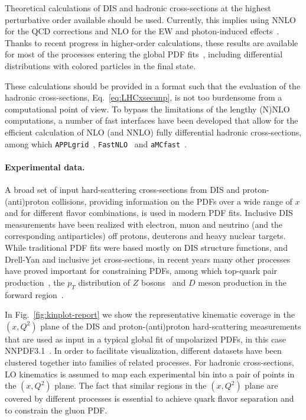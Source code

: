 Theoretical calculations of DIS and hadronic cross-sections at the highest 
perturbative order available should be used.
%
Currently, this implies using NNLO for the QCD corrections and NLO
for the EW and photon-induced effects~\cite{Manohar:2016nzj,Manohar:2017eqh}.
%
Thanks to recent progress in higher-order calculations, these results
are available for most of the processes entering the global
PDF fits~\cite{Currie:2016bfm,Campbell:2016lzl,Czakon:2016dgf,
Boughezal:2017nla,Li:2012wna}, including differential distributions with 
colored particles in the final state.

These calculations should be provided in
a format such that the evaluation of the hadronic
cross-sections, Eq.~\eqref{eq:LHCxsecunp}, is not too burdensome
from a computational point of view.
%
To bypass the limitations of the lengthy (N)NLO
computations, a number of fast interfaces have
been developed that allow for the efficient calculation
of NLO (and NNLO) fully differential hadronic cross-sections,
among which {\tt APPLgrid}~\cite{Carli:2010rw},
{\tt FastNLO}~\cite{Wobisch:2011ij} and {\tt aMCfast}~\cite{Bertone:2014zva}.

\paragraph*{Experimental data.}
A broad set of input hard-scattering cross-sections from DIS and
proton-(anti)proton collisions, providing information on the PDFs over a wide 
range of $x$ and for different flavor combinations, is used in modern PDF fits.
%
Inclusive DIS measurements have been realized with electron, muon and neutrino
(and the corresponding antiparticles) off protons, deuterons and
heavy nuclear targets. 
%
While traditional PDF fits were based mostly on DIS structure functions, 
and Drell-Yan and inclusive jet cross-sections, in recent years many other 
processes have proved important for constraining PDFs, among which
top-quark pair production~\cite{Czakon:2016olj}, the $p_T$ distribution of $Z$ 
bosons~\cite{Boughezal:2017nla} and $D$ meson production in 
the forward region~\cite{Gauld:2016kpd}.

In Fig.~\ref{fig:kinplot-report} we show the representative kinematic coverage 
in the $(x,Q^2)$ plane of the DIS and proton-(anti)proton hard-scattering 
measurements that are used as input in a typical global fit of unpolarized 
PDFs, in this case NNPDF3.1~\cite{Ball:2017nwa}.
%
In order to facilitate visualization, different datasets have been clustered 
together into families of related processes.
%
For hadronic cross-sections, LO kinematics is assumed to map
each experimental bin into a pair of points in the $(x,Q^2)$ plane.
%
The fact that similar regions in the $(x,Q^2)$ plane are covered by
different processes is essential to achieve quark
flavor separation and to constrain the gluon PDF.

